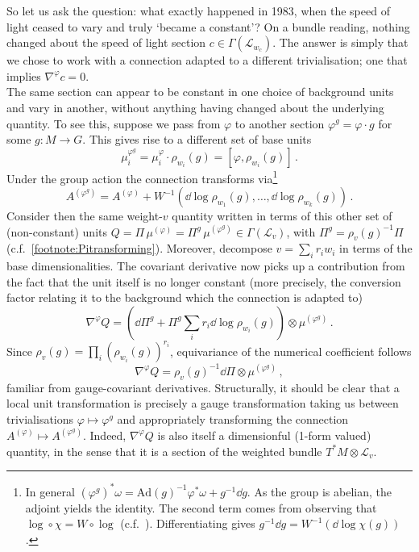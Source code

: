 \documentclass[12pt]{article}
\numberwithin{equation}{section}
\begin{document}
So let us ask the question: what exactly happened in 1983, when the speed of light ceased to vary and truly `became a constant'? On a bundle reading, nothing changed about the speed of light section $c\in \Gamma(\mathcal{L}_{w_c})$. The answer is simply that we chose to work with a connection adapted to a different trivialisation; one that implies $\nabla^\varphi c=0$.\\
The same section can appear to be constant in one choice of background units and vary in another, without anything having changed about the underlying quantity. To see this, suppose we pass from $\varphi$ to another section $\varphi^g=\varphi\cdot g$ for some $g\colon M\to G$. This gives rise to a different set of base units
\begin{equation}
    \mu^{\varphi^g}_i = \mu^{\varphi}_i \cdot \rho_{w_i}(g) = [\varphi,\rho_{w_i}(g)]\,.
\end{equation}
Under the group action the connection transforms via\footnote{In general $(\varphi^g)^* \omega = \mathrm{Ad}(g)^{-1}\varphi^*\omega + g^{-1}\dd g$. As the group is abelian, the adjoint yields the identity. The second term comes from observing that $\log\circ \chi = W\circ\log$ (c.f.~). Differentiating gives $g^{-1}\dd g = W^{-1}(\dd \log \chi(g))$.}
\begin{equation}\label{eq:connection}
    A^{(\varphi^g)} = A^{(\varphi)} + W^{-1}(\dd \log \rho_{w_1}(g),\dots,\dd \log\rho_{w_k}(g))\,.
\end{equation}
Consider then the same weight-$v$ quantity written in terms of this other set of (non-constant) units $Q = \Pi\,\mu^{(\varphi)}=\Pi^g\, \mu^{(\varphi^g)}\in \Gamma(\mathcal{L}_v)$, with ${\Pi^g=\rho_v(g)^{-1}\Pi}$ (c.f.~\cref{footnote:Pitransforming}). Moreover, decompose $v=\sum_i r_iw_i$ in terms of the base dimensionalities. The covariant derivative now picks up a contribution from the fact that the unit itself is no longer constant (more precisely, the conversion factor relating it to the background which the connection is adapted to)
\begin{equation}
    \nabla^\varphi Q = (\dd \Pi^g + \Pi^g \sum_i r_i\dd \log\rho_{w_i}(g)) \otimes \mu^{(\varphi^g)}\,.
\end{equation}
Since $\rho_v(g) = \prod_i (\rho_{w_i}(g))^{r_i}$, equivariance of the numerical coefficient follows
\begin{equation}
    \nabla^\varphi Q = \rho_v(g)^{-1}\dd \Pi \otimes \mu^{(\varphi^g)}\,,
\end{equation}
familiar from gauge-covariant derivatives. Structurally, it should be clear that a local unit transformation is precisely a gauge transformation taking us between trivialisations $\varphi\mapsto \varphi^g$ and appropriately transforming the connection $A^{(\varphi)}\mapsto A^{(\varphi^g)}$. Indeed, $\nabla^\varphi Q$ is also itself a dimensionful (1-form valued) quantity, in the sense that it is a section of the weighted bundle $T^*M\otimes \mathcal{L}_v$.
\end{document}
